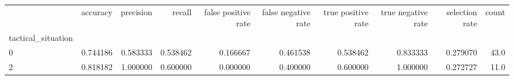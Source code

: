 \begin{tabular}{lrrrrrrrrr}
\toprule
{} &  accuracy &  precision &    recall &  false positive rate &  false negative rate &  true positive rate &  true negative rate &  selection rate &  count \\
tactical\_situation &           &            &           &                      &                      &                     &                     &                 &        \\
\midrule
0                  &  0.744186 &   0.583333 &  0.538462 &             0.166667 &             0.461538 &            0.538462 &            0.833333 &        0.279070 &   43.0 \\
2                  &  0.818182 &   1.000000 &  0.600000 &             0.000000 &             0.400000 &            0.600000 &            1.000000 &        0.272727 &   11.0 \\
\bottomrule
\end{tabular}
